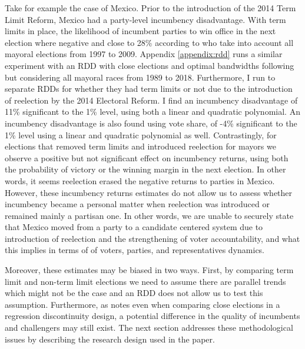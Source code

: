 \documentclass[12pt]{amsart}
\makeatletter
\def\section{\@startsection{section}{1}
	\z@{1.0\linespacing\@plus\linespacing}{.5\linespacing}{\Large}}
\numberwithin{equation}{section}
\theoremstyle{definition}
\theoremstyle{definition}
\theoremstyle{definition}
\makeatother
\begin{document}
Take for example the case of Mexico. Prior to the introduction of the 2014 Term Limit Reform, Mexico had a party-level incumbency disadvantage. With term limits in place, the likelihood of incumbent parties to win office in the next election where negative and close to 28\% according to \citet{klasnja_titiunik_2017} who take into account all mayoral elections from 1997 to 2009. Appendix \ref{appendix:rdd} runs a similar experiment with an RDD with close elections and optimal bandwidths following \citet{calonicoetal_2014} but considering all mayoral races from 1989 to 2018. Furthermore, I run to separate RDDs for whether they had term limits or not due to the introduction of reelection by the 2014 Electoral Reform. I find an incumbency disadvantage of 11\% significant to the 1\% level, using both a linear and quadratic polynomial. An incumbency disadvantage is also found using vote share, of -4\% significant to the 1\% level using a linear and quadratic polynomial as well. Contrastingly, for elections that removed term limits and introduced reelection for mayors we observe a positive but not significant effect on incumbency returns, using both the probability of victory or the winning margin in the next election. In other words, it seems reelection erased the negative returns to parties in Mexico. However, these incumbency returns estimates do not allow us to assess whether incumbency became a personal matter when reelection was introduced or remained mainly a partisan one. In other words, we are unable to securely state that Mexico moved from a party to a candidate centered system due to introduction of reelection and the strengthening of voter accountability, and what this implies in terms of of voters, parties, and representatives dynamics.

 Moreover, these estimates may be biased in two ways. First, by comparing term limit and non-term limit elections we need to assume there are parallel trends which might not be the case and an RDD does not allow us to test this assumption. Furthermore, as \citet{eggers_2017} notes even when comparing close elections in a regression discontinuity design, a potential difference in the quality of incumbents and challengers may still exist. The next section addresses these methodological issues by describing the research design used in the paper.  
 

\end{document}
